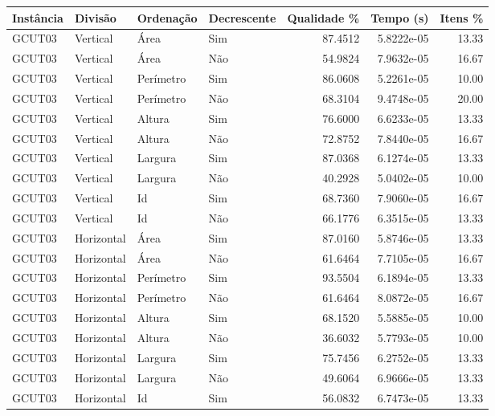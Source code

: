\begin{tabular}{llllrrr}
\hline
Instância & Divisão     & Ordenação & Decrescente & Qualidade \% & Tempo (s)  & Itens \% \\
\hline
GCUT03    & Vertical    & Área      & Sim         & 87.4512      & 5.8222e-05 & 13.33    \\
GCUT03    & Vertical    & Área      & Não         & 54.9824      & 7.9632e-05 & 16.67    \\
GCUT03    & Vertical    & Perímetro & Sim         & 86.0608      & 5.2261e-05 & 10.00    \\
GCUT03    & Vertical    & Perímetro & Não         & 68.3104      & 9.4748e-05 & 20.00    \\
GCUT03    & Vertical    & Altura    & Sim         & 76.6000      & 6.6233e-05 & 13.33    \\
GCUT03    & Vertical    & Altura    & Não         & 72.8752      & 7.8440e-05 & 16.67    \\
GCUT03    & Vertical    & Largura   & Sim         & 87.0368      & 6.1274e-05 & 13.33    \\
GCUT03    & Vertical    & Largura   & Não         & 40.2928      & 5.0402e-05 & 10.00    \\
GCUT03    & Vertical    & Id        & Sim         & 68.7360      & 7.9060e-05 & 16.67    \\
GCUT03    & Vertical    & Id        & Não         & 66.1776      & 6.3515e-05 & 13.33    \\
GCUT03    & Horizontal  & Área      & Sim         & 87.0160      & 5.8746e-05 & 13.33    \\
GCUT03    & Horizontal  & Área      & Não         & 61.6464      & 7.7105e-05 & 16.67    \\
GCUT03    & Horizontal  & Perímetro & Sim         & 93.5504      & 6.1894e-05 & 13.33    \\
GCUT03    & Horizontal  & Perímetro & Não         & 61.6464      & 8.0872e-05 & 16.67    \\
GCUT03    & Horizontal  & Altura    & Sim         & 68.1520      & 5.5885e-05 & 10.00    \\
GCUT03    & Horizontal  & Altura    & Não         & 36.6032      & 5.7793e-05 & 10.00    \\
GCUT03    & Horizontal  & Largura   & Sim         & 75.7456      & 6.2752e-05 & 13.33    \\
GCUT03    & Horizontal  & Largura   & Não         & 49.6064      & 6.9666e-05 & 13.33    \\
GCUT03    & Horizontal  & Id        & Sim         & 56.0832      & 6.7473e-05 & 13.33    \\

\end{tabular}
